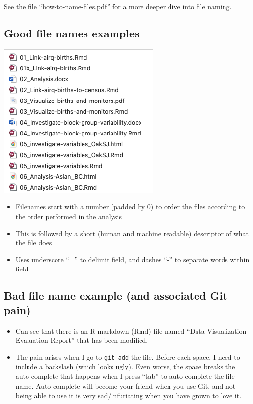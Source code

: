 \documentclass[
]{book}
\providecommand{\tightlist}{%
  \setlength{\itemsep}{0pt}\setlength{\parskip}{0pt}}
\begin{document}
See the file ``how-to-name-files.pdf'' for a more deeper dive into file naming.

\hypertarget{good-file-names-examples}{%
\subsection{Good file names examples}\label{good-file-names-examples}}

\includegraphics[width=0.75\linewidth]{./figures/Variable-names-example}

\begin{itemize}
\tightlist
\item
  Filenames start with a number (padded by 0) to order the files according to
  the order performed in the analysis
\item
  This is followed by a short (human and machine readable) descriptor of what
  the file does
\item
  Uses underscore ``\_'' to delimit field, and dashes ``-'' to separate words within field
\end{itemize}

\hypertarget{bad-file-name-example-and-associated-git-pain}{%
\subsection{Bad file name example (and associated Git pain)}\label{bad-file-name-example-and-associated-git-pain}}

\begin{itemize}
\tightlist
\item
  Can see that there is an R markdown (Rmd) file named ``Data Visualization Evaluation Report'' that has been modified.
\item
  The pain arises when I go to \texttt{git\ add} the file. Before each space, I need to
  include a backslash (which looks ugly). Even worse, the space breaks the auto-complete that happens when I press ``tab'' to auto-complete the file name.
  Auto-complete will become your friend when you use Git, and not being able to
  use it is very sad/infuriating when you have grown to love it.
\end{itemize}
\end{document}
